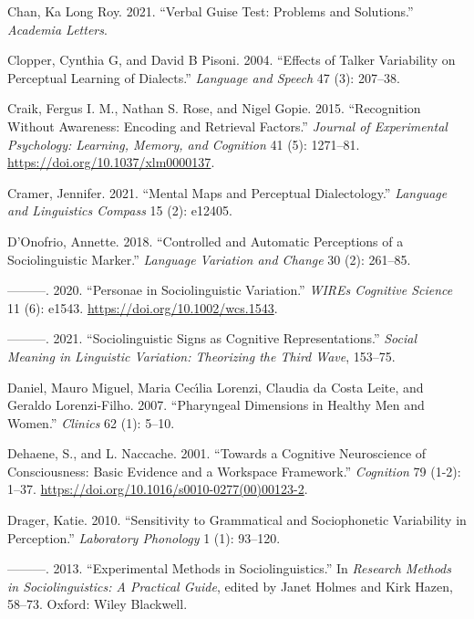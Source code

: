 \documentclass[
  letterpaper,
  DIV=11,
  numbers=noendperiod]{scrartcl}
\newlength{\cslhangindent}
\newenvironment{CSLReferences}[2] %
 {\begin{list}{}{%
  \setlength{\itemindent}{0pt}
  \setlength{\leftmargin}{0pt}
  \setlength{\parsep}{0pt}
  \ifodd #1
   \setlength{\leftmargin}{\cslhangindent}
   \setlength{\itemindent}{-1\cslhangindent}
  \fi
  \setlength{\itemsep}{#2\baselineskip}}}
 {\end{list}}
\begin{document}
\begin{CSLReferences}{1}{0}
Chan, Ka Long Roy. 2021. {``Verbal Guise Test: Problems and
Solutions.''} \emph{Academia Letters}.

Clopper, Cynthia G, and David B Pisoni. 2004. {``Effects of Talker
Variability on Perceptual Learning of Dialects.''} \emph{Language and
Speech} 47 (3): 207--38.

Craik, Fergus I. M., Nathan S. Rose, and Nigel Gopie. 2015.
{``Recognition Without Awareness: {Encoding} and Retrieval Factors.''}
\emph{Journal of Experimental Psychology: Learning, Memory, and
Cognition} 41 (5): 1271--81. \url{https://doi.org/10.1037/xlm0000137}.

Cramer, Jennifer. 2021. {``Mental Maps and Perceptual Dialectology.''}
\emph{Language and Linguistics Compass} 15 (2): e12405.

D'Onofrio, Annette. 2018. {``Controlled and Automatic Perceptions of a
Sociolinguistic Marker.''} \emph{Language Variation and Change} 30 (2):
261--85.

---------. 2020. {``Personae in Sociolinguistic Variation.''}
\emph{WIREs Cognitive Science} 11 (6): e1543.
\url{https://doi.org/10.1002/wcs.1543}.

---------. 2021. {``Sociolinguistic Signs as Cognitive
Representations.''} \emph{Social Meaning in Linguistic Variation:
Theorizing the Third Wave}, 153--75.

Daniel, Mauro Miguel, Maria Cecı́lia Lorenzi, Claudia da Costa Leite, and
Geraldo Lorenzi-Filho. 2007. {``Pharyngeal Dimensions in Healthy Men and
Women.''} \emph{Clinics} 62 (1): 5--10.

Dehaene, S., and L. Naccache. 2001. {``Towards a Cognitive Neuroscience
of Consciousness: Basic Evidence and a Workspace Framework.''}
\emph{Cognition} 79 (1-2): 1--37.
\url{https://doi.org/10.1016/s0010-0277(00)00123-2}.

Drager, Katie. 2010. {``Sensitivity to Grammatical and Sociophonetic
Variability in Perception.''} \emph{Laboratory Phonology} 1 (1):
93--120.

---------. 2013. {``Experimental Methods in Sociolinguistics.''} In
\emph{Research Methods in Sociolinguistics: A Practical Guide}, edited
by Janet Holmes and Kirk Hazen, 58--73. Oxford: Wiley Blackwell.


\end{CSLReferences}
\end{document}
